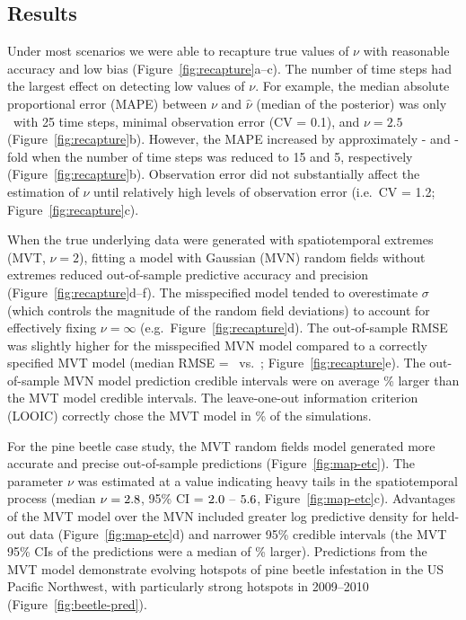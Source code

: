 \documentclass[12pt,english]{article}
\begin{document}
\begin{spacing}{1.9}
\section{Results}

Under most scenarios we were able to recapture true values of $\nu$ with
reasonable accuracy and low bias (Figure~\ref{fig:recapture}a--c). The number of
time steps had the largest effect on detecting low values of $\nu$. For example,
the median absolute proportional error (MAPE) between $\nu$ and $\hat{\nu}$
(median of the posterior) was only \mapeTwentyFive\ with 25 time steps, minimal
observation error (CV = 0.1), and $\nu = 2.5$ (Figure~\ref{fig:recapture}b).
However, the MAPE increased by approximately \mapeFifteenIncFold - and
\mapeFiveIncFold -fold when the number of time steps was reduced to 15 and 5,
respectively (Figure~\ref{fig:recapture}b). Observation error did not
substantially affect the estimation of $\nu$ until relatively high levels of
observation error (i.e.\ CV = 1.2; Figure~\ref{fig:recapture}c).

When the true underlying data were generated with spatiotemporal extremes (MVT,
$\nu = 2$), fitting a model with Gaussian (MVN) random fields without extremes
reduced out-of-sample predictive accuracy and precision
(Figure~\ref{fig:recapture}d--f). The misspecified model tended to overestimate
$\sigma$ (which controls the magnitude of the random field deviations) to
account for effectively fixing $\nu = \infty$ (e.g.\
Figure~\ref{fig:recapture}d). The out-of-sample RMSE was slightly higher for the
misspecified MVN model compared to a correctly specified MVT model (median RMSE
= \rmseWrong\ vs.\ \rmseRight; Figure~\ref{fig:recapture}e). The out-of-sample
MVN model prediction credible intervals were on average \meanMedianCIWiderSim \%
larger than the MVT model credible intervals. The leave-one-out information
criterion (LOOIC) correctly chose the MVT model in \looCorrectSim \% of the
simulations.

For the pine beetle case study, the MVT random fields model generated more
accurate and precise out-of-sample predictions (Figure~\ref{fig:map-etc}). The
parameter $\nu$ was estimated at a value indicating heavy tails in the
spatiotemporal process (median $\nu = 2.8$, 95\% CI =
$2.0$ -- $5.6$, Figure~\ref{fig:map-etc}c). Advantages of
the MVT model over the MVN included greater log predictive density for held-out
data (Figure~\ref{fig:map-etc}d)
and narrower 95\% credible intervals (the MVT 95\% CIs of the predictions were a
median of \percLargerCIsBeetles \% larger). Predictions from the MVT model
demonstrate evolving hotspots of pine beetle infestation in the US Pacific
Northwest, with particularly strong hotspots in 2009--2010
(Figure~\ref{fig:beetle-pred}).


\end{spacing}
\end{document}

